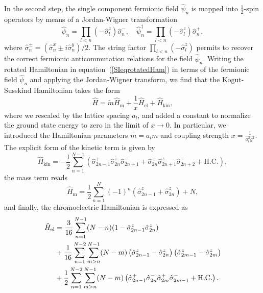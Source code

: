 \documentclass[twocolumn,aps,showpacs,prb,superscriptaddress,floatfix,10pt,nofootinbib]{revtex4-2}
\begin{document}
In the second step, the single component fermionic field $\hat{\psi}_{n}$ is mapped into $\frac{1}{2}$-spin operators by means of a Jordan-Wigner transformation \cite{JordanWigner}
\begin{equation}
\hat{\psi}_{n}=\prod_{l<n}\left(-\hat{\sigma}_{l}^{z}\right)\hat{\sigma}_{n}^{-}, \quad \hat{\psi}_{n}^{\dagger}=\prod_{l<n}\left(-\hat{\sigma}_{l}^{z}\right)\hat{\sigma}_{n}^{+},
\end{equation}
where $\hat{\sigma}_{n}^{\pm}=(\hat{\sigma}_{n}^{x}\pm i \hat{\sigma}_{n}^{y})/2$. The string factor $\prod_{l<n}\left(-\hat{\sigma}_{l}^{z}\right)$ permits to recover the correct fermionic anticommutation relations for the field $\hat{\psi}_{n}$.
Writing the rotated Hamiltonian in equation~(\ref{SIeqrotatedHam}) in terms of the fermionic field $\hat{\psi}_{n}$ and  applying the Jordan-Wigner transform, we find that the Kogut-Susskind Hamiltonian takes the form
\begin{equation}
\hat{H}= \tilde{m} \hat{H}_{\text{m}} + \frac{1}{x} \hat{H}_{\text{el}} + \hat{H}_{\text{kin}}, \label{SIdimensionlessHam}
\end{equation}
where we rescaled by the lattice spacing $a_l$, and added a constant to normalize the ground state energy to zero in the limit of $x\to0$. In particular, we introduced the Hamiltonian parameters $\tilde{m}=a_l m$ and coupling strength $x=\frac{1}{a_l^{2}g^{2}}$.
The explicit form of the kinetic term is given by 
\begin{equation}
\hat{H}_{\text{kin}} =-\frac{1}{2}\sum_{n=1}^{N-1}\left( \hat{\sigma}_{2n-1}^{+}\hat{\sigma}_{2n}^{z}\hat{\sigma}_{2n+1}^{-}+\hat{\sigma}_{2n}^{+}\hat{\sigma}_{2n+1}^{z}\hat{\sigma}_{2n+2}^{-}+\mathrm{H.C.}\right), \label{kineticterm}
\end{equation}
the mass term reads
\begin{equation}
\hat{H}_{\text{m}}=\frac{1}{2}\sum_{n=1}^{N}(-1)^{n}\left( \hat{\sigma}_{2n-1}^{z}+\hat{\sigma}_{2n}^{z}\right)+ N, \label{massHamiltonian}
\end{equation}
and finally, the chromoelectric Hamiltonian is expressed as
\begin{align}
\notag	\hat{H}_{\text{el}}&=\frac{3}{16}\sum_{n=1}^{N-1}(N-n)(1-\hat{\sigma}_{2n-1}^{z}\hat{\sigma}_{2n}^{z})\\ \notag &+\frac{1}{16}\sum_{n=1}^{N-2}\sum_{m>n}^{N-1}(N-m)\left(\hat{\sigma}_{2n-1}^{z}-\hat{\sigma}_{2n}^{z}\right)\left(\hat{\sigma}_{2m-1}^{z}-\hat{\sigma}_{2m}^{z}\right)\\
&+\frac{1}{2}\sum_{n=1}^{N-2}\sum_{m>n}^{N-1}(N-m)\left(\hat{\sigma}_{2n-1}^{+}\hat{\sigma}_{2n}^{-}\hat{\sigma}_{2m}^{+}\hat{\sigma}_{2m-1}^{-}+\mathrm{H.C.}\right). \label{SIqubitelectric}
\end{align}
\end{document}
